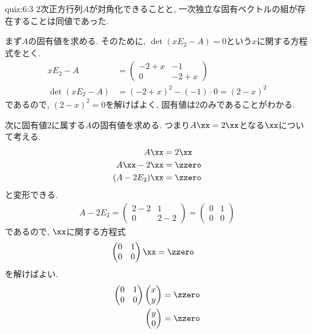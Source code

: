 \begin{answerof}{quiz:6:3}
  $2$次正方行列$A$が対角化できることと,
  一次独立な固有ベクトルの組が存在することは同値であった.

  まず$A$の固有値を求める.
  そのために, $\det(xE_2-A)=0$という$x$に関する方程式をとく.
  \begin{align*}
    xE_2-A&=\begin{pmatrix}-2+x&-1\\0&-2+x\end{pmatrix}\\
    \det(xE_2-A)&=(-2+x)^2-(-1)\cdot 0=(2-x)^2
  \end{align*}
  であるので, $(2-x)^2=0$を解けばよく,
  固有値は$2$のみであることがわかる.

  次に固有値$2$に属する$A$の固有値を求める.
  つまり$A\xx=2\xx$となる$\xx$について考える.
  \begin{align*}
    A\xx&=2\xx\\
    A\xx-2\xx&=\zzero \\
    (A-2E_2)\xx&=\zzero
  \end{align*}
  と変形できる.
  \begin{align*}
    A-2E_2=\begin{pmatrix}2-2&1\\0&2-2\end{pmatrix}
    =\begin{pmatrix}0&1\\0&0\end{pmatrix}
  \end{align*}
  であるので, $\xx$に関する方程式
  \begin{align*}
    \begin{pmatrix}0&1\\0&0\end{pmatrix}\xx&=\zzero
  \end{align*}
  を解けばよい.
  \begin{align*}
    \begin{pmatrix}0&1\\0&0\end{pmatrix}
      \begin{pmatrix}x\\y\end{pmatrix}
      &=\zzero\\
      \begin{pmatrix}y\\0\end{pmatrix}
      &=\zzero\\
  \end{align*}

\end{answerof}
